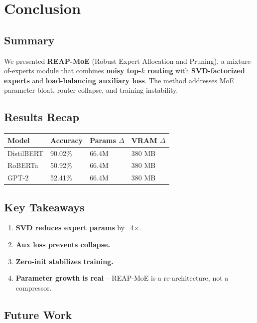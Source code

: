 \section{Conclusion}

\subsection{Summary}

We presented \textbf{REAP-MoE} (Robust Expert Allocation and Pruning), a 
mixture-of-experts module that combines \textbf{noisy top-$k$ routing} with 
\textbf{SVD-factorized experts} and \textbf{load-balancing auxiliary loss}. The method 
addresses MoE parameter bloat, router collapse, and training instability.

\subsection{Results Recap}

\begin{table}[H]
\centering
\small
\begin{tabular}{llll}
\toprule
\textbf{Model} & \textbf{Accuracy} & \textbf{Params $\Delta$} & \textbf{VRAM $\Delta$} \\
\midrule
DistilBERT & 90.02\% & 66.4M & 380 MB \\
RoBERTa & 50.92\% & 66.4M & 380 MB \\
GPT-2 & 52.41\% & 66.4M & 380 MB \\
\bottomrule
\end{tabular}
\end{table}

\subsection{Key Takeaways}

\begin{enumerate}
\item \textbf{SVD reduces expert params} by ~4$\times$.
\item \textbf{Aux loss prevents collapse.}
\item \textbf{Zero-init stabilizes training.}
\item \textbf{Parameter growth is real} -- REAP-MoE is a re-architecture, not a
  compressor.

\end{enumerate}
\subsection{Future Work}

